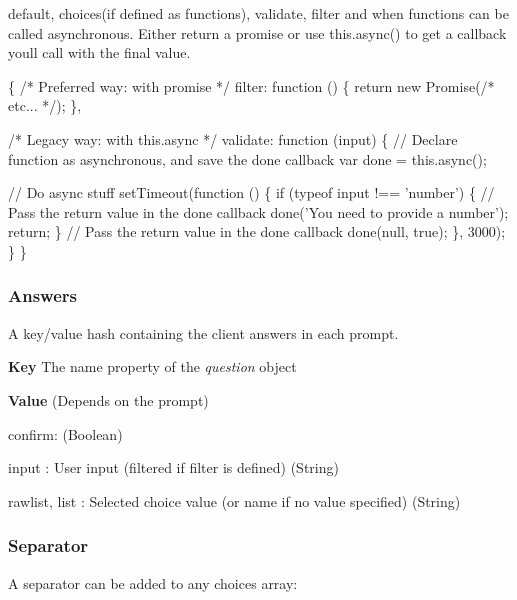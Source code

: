 {\ttfamily default}, {\ttfamily choices}(if defined as functions), {\ttfamily validate}, {\ttfamily filter} and {\ttfamily when} functions can be called asynchronous. Either return a promise or use {\ttfamily this.\+async()} to get a callback you\textquotesingle{}ll call with the final value.


\begin{DoxyCode}
\{
  /* Preferred way: with promise */
  filter: function () \{
    return new Promise(/* etc... */);
  \},

  /* Legacy way: with this.async */
  validate: function (input) \{
    // Declare function as asynchronous, and save the done callback
    var done = this.async();

    // Do async stuff
    setTimeout(function () \{
      if (typeof input !== 'number') \{
        // Pass the return value in the done callback
        done('You need to provide a number');
        return;
      \}
      // Pass the return value in the done callback
      done(null, true);
    \}, 3000);
  \}
\}
\end{DoxyCode}


\subsubsection*{Answers}

\label{_answers}%
 A key/value hash containing the client answers in each prompt.


\begin{DoxyItemize}
\item {\bfseries Key} The {\ttfamily name} property of the {\itshape question} object
\item {\bfseries Value} (Depends on the prompt)
\begin{DoxyItemize}
\item {\ttfamily confirm}\+: (Boolean)
\item {\ttfamily input} \+: User input (filtered if {\ttfamily filter} is defined) (String)
\item {\ttfamily rawlist}, {\ttfamily list} \+: Selected choice value (or name if no value specified) (String)
\end{DoxyItemize}
\end{DoxyItemize}

\subsubsection*{Separator}

\label{_separator}%
 A separator can be added to any {\ttfamily choices} array\+:


